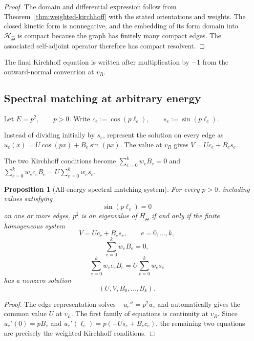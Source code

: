 \documentclass[11pt]{article}
\theoremstyle{plain}
\newtheorem{proposition}[theorem]{Proposition}
\theoremstyle{definition}
\begin{document}
\begin{proof}
The domain and differential expression follow from
Theorem~\ref{thm:weighted-kirchhoff} with the stated orientations and
weights. The closed kinetic form is nonnegative, and the embedding of its
form domain into \(\mathcal H_{\widehat\Theta}\) is compact because the graph
has finitely many compact edges. The associated self-adjoint operator
therefore has compact resolvent.
\end{proof}

The final Kirchhoff equation is written after multiplication by \(-1\) from
the outward-normal convention at \(v_R\).

\subsection{Spectral matching at arbitrary energy}
\label{subsec:compact-theta-DN}

Let
\(E=p^2, \qquad p>0\).
Write
\(c_e:=\cos(p\ell_e), \qquad s_e:=\sin(p\ell_e)\).

Instead of dividing initially by \(s_e\), represent the solution on every
edge as
\(u_e(x) = U\cos(px)+B_e\sin(px)\).
The value at \(v_R\) gives
\(V=Uc_e+B_es_e\).

The two Kirchhoff conditions become \(\sum_{e=0}^{k}w_eB_e=0\) and
\(\sum_{e=0}^{k}w_ec_eB_e = U\sum_{e=0}^{k}w_es_e\).

\begin{proposition}[All-energy spectral matching system]
\label{prop:compact-theta-all-energy}
For every \(p>0\), including values satisfying
\[
  \sin(p\ell_e)=0
\]
on one or more edges, \(p^2\) is an eigenvalue of
\(H_{\widehat\Theta}\) if and only if the finite homogeneous system
\[
  V=Uc_e+B_es_e,
  \qquad
  e=0,\ldots,k,
\]
\[
  \sum_{e=0}^{k}w_eB_e=0,
\]
\[
  \sum_{e=0}^{k}w_ec_eB_e
  =
  U\sum_{e=0}^{k}w_es_e
\]
has a nonzero solution
\[
  (U,V,B_0,\ldots,B_k).
\]
\end{proposition}

\begin{proof}
The edge representation solves \(-u_e''=p^2u_e\) and automatically gives the common value \(U\) at \(v_L\). The first family
of equations is continuity at \(v_R\). Since \(u_e'(0)=pB_e\) and
\(u_e'(\ell_e) = p(-Us_e+B_ec_e)\),
the remaining two equations are precisely the weighted Kirchhoff
conditions.
\end{proof}
\end{document}
